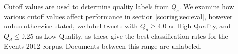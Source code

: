 Cutoff values are used to determine quality labels from \(Q_s\).
We examine how various cutoff values affect performance in section \ref{scoring:sec:eval}, however unless otherwise stated, we label tweets with \(Q_d \geq 4.0\) as High Quality, and \(Q_d \leq 0.25\) as Low Quality, as these give the best classification rates for the Events 2012 corpus.
Documents between this range are unlabeled.
